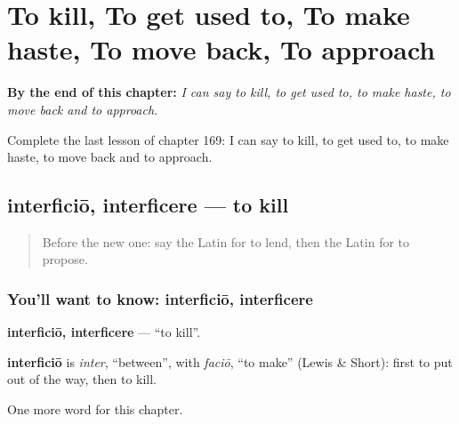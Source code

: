 
\chapter{To kill, To get used to, To make haste, To move back, To approach}
\label{ch:la-to-kill-to-get-used-to-to-make-haste-to-move-back-to-approach}

\begin{chapteropening}
\textbf{By the end of this chapter:} \emph{I can say to kill, to get used to, to make haste, to move back and to approach.}

Complete the last lesson of chapter 169: I can say to kill, to get used to, to make haste, to move back and to approach.
\end{chapteropening}

\section[interficiō, interficere]{interficiō, interficere — to kill}

\label{lesson:LA-C169-interficio}



\begin{quote}
Before the new one: say the Latin for to lend, then the Latin for to propose.
\end{quote}

\subsection*{You'll want to know: interficiō, interficere}
\textbf{interficiō, interficere} — \textquotedblleft{}to kill\textquotedblright{}.

\begin{cousinweb}
\textbf{interficiō} is \emph{inter}, \textquotedblleft{}between\textquotedblright{}, with \emph{faciō}, \textquotedblleft{}to make\textquotedblright{} (Lewis \& Short): first to put out of the way, then to kill.
\end{cousinweb}

\begin{grammarlens}[title={What you've built}]
One more word for this chapter.
\end{grammarlens}


